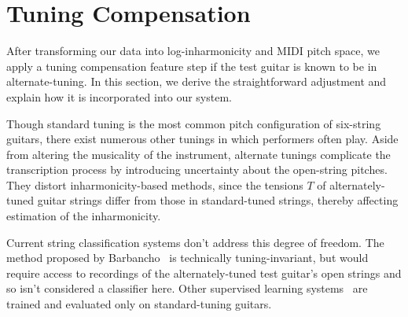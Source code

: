 \documentclass[12pt]{cmuthesis}
\begin{document}
\section{Tuning Compensation}
After transforming our data into log-inharmonicity and MIDI pitch space, we apply a tuning compensation feature step if the test guitar is known to be in alternate-tuning. In this section, we derive the straightforward adjustment and explain how it is incorporated into our system. 

Though standard tuning is the most common pitch configuration of six-string guitars, there exist numerous other tunings in which performers often play. Aside from altering the musicality of the instrument, alternate tunings complicate the transcription process by introducing uncertainty about the open-string pitches. They distort inharmonicity-based methods, since the tensions $T$ of alternately-tuned guitar strings differ from those in standard-tuned strings, thereby affecting estimation of the inharmonicity. 

Current string classification systems don't address this degree of freedom. The method proposed by Barbancho~\cite{barbanchoi2012} is technically tuning-invariant, but would require access to recordings of the alternately-tuned test guitar's open strings and so isn't considered a classifier here. Other supervised learning systems~\cite{kehling2014, dittmar2013, abesser2012} are trained and evaluated only on standard-tuning guitars.
\end{document}
